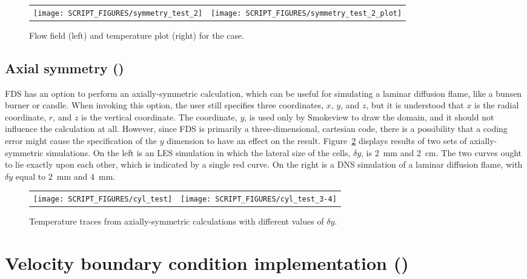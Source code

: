 \documentclass[11pt]{book}
\begin{document}
\begin{figure}[!ht]
\begin{tabular*}{\textwidth}{lr}
\texttt{[image: SCRIPT\_FIGURES/symmetry\_test\_2]} &
\texttt{[image: SCRIPT\_FIGURES/symmetry\_test\_2\_plot]}
\end{tabular*}
\caption[The  case]{Flow field (left) and temperature plot (right) for the  case.}
\label{symmetry_test_2_fig}
\end{figure}



\subsection{Axial symmetry (\texorpdfstring{}{cyl\_test})}
\label{cyl_test}

FDS has an option to perform an axially-symmetric calculation, which can be useful for simulating a laminar diffusion flame, like a bunsen burner or candle. When invoking this option, the user still specifies three coordinates, $x$, $y$, and $z$, but it is understood that $x$ is the radial coordinate, $r$, and $z$ is the vertical coordinate. The coordinate, $y$, is used only by Smokeview to draw the domain, and it should not influence the calculation at all. However, since FDS is primarily a three-dimensional, cartesian code, there is a possibility that a coding error might cause the specification of the $y$ dimension to have an effect on the result. Figure~\ref{cyl_test_fig} displays results of two sets of axially-symmetric simulations. On the left is an LES simulation in which the lateral size of the cells, $\delta y$, is 2~mm and 2~cm. The two curves ought to lie exactly upon each other, which is indicated by a single red curve. On the right is a DNS simulation of a laminar diffusion flame, with $\delta y$ equal to 2~mm and 4~mm.

\begin{figure}[!ht]
\begin{tabular*}{\textwidth}{lr}
\texttt{[image: SCRIPT\_FIGURES/cyl\_test]} &
\texttt{[image: SCRIPT\_FIGURES/cyl\_test\_3-4]}
\end{tabular*}
\caption[The  test cases]{Temperature traces from axially-symmetric calculations with different values of $\delta y$.}
\label{cyl_test_fig}
\end{figure}

\section{Velocity boundary condition implementation (\texorpdfstring{}{velocity\_bc\_test})}
\label{velocity_bc_test}
\end{document}
